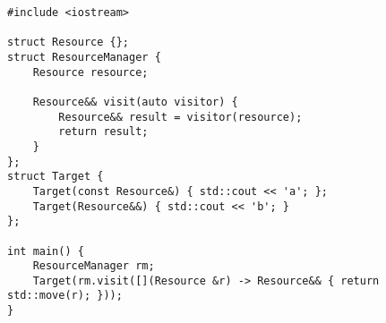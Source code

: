 \begin{lstlisting}[title=\href{https://godbolt.org/z/as72rY}{\texttt{godbolt.org/z/as72rY}}]
#include <iostream>

struct Resource {};
struct ResourceManager {
    Resource resource;

    Resource&& visit(auto visitor) {
        Resource&& result = visitor(resource);
        return result;
    }
};
struct Target {
    Target(const Resource&) { std::cout << 'a'; };
    Target(Resource&&) { std::cout << 'b'; }
};

int main() {
    ResourceManager rm;
    Target(rm.visit([](Resource &r) -> Resource&& { return std::move(r); }));
}
\end{lstlisting}
